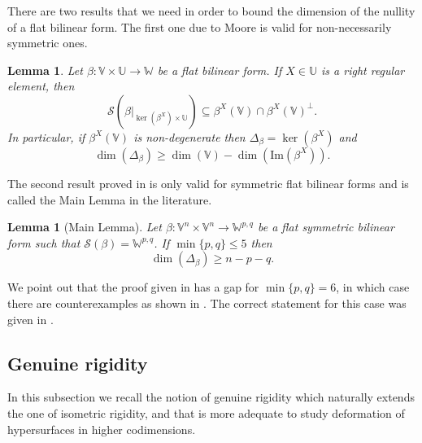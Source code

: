 \documentclass{article}
\newtheorem{lema}[thm]{Lemma}
\theoremstyle{remark}
\begin{document}
There are two results that we need in order to bound the dimension of the nullity of a flat bilinear form. The first one due to Moore \cite{Moo} is valid for non-necessarily symmetric ones.
\begin{lema}\label{nulidad para no simetrica}
    Let $\beta:\mathbb{V}\times \mathbb{U}\rightarrow \mathbb{W}$ be a flat bilinear form. If $X\in \mathbb{U}$ is a right regular element, then
    \begin{equation*}
        \mathcal{S}(\beta|_{\ker(\beta^X)\times \mathbb{U}})\subseteq \beta^X(\mathbb{V})\cap\beta^X(\mathbb{V})^\perp.
    \end{equation*}
    In particular, if $\beta^X(\mathbb{V})$ is non-degenerate then $\Delta_\beta=\ker(\beta^X)$ and
    \begin{equation*}
        \dim(\Delta_\beta)\geq \dim(\mathbb{V})-\dim(\text{Im}(\beta^X)).
    \end{equation*}
\end{lema}

The second result proved in \cite{DF4} is only valid for symmetric flat bilinear forms and is called the Main Lemma in the literature.
\begin{lema}[Main Lemma]\label{Main lemma}
    Let $\beta:\mathbb{V}^n\times \mathbb{V}^n\rightarrow \mathbb{W}^{p,q}$ be a flat symmetric bilinear form such that $\mathcal{S}(\beta)=\mathbb{W}^{p,q}$. If $\min\{p,q\}\leq 5$ then
    \begin{equation*}
        \dim(\Delta_\beta)\geq n-p-q.
    \end{equation*}
\end{lema}
We point out that the proof given in \cite{DF4} has a gap for $\min\{p,q\}=6$, in which case there are counterexamples as shown in \cite{DF5}. The correct statement for this case was given in \cite{DF3}.
\subsection{Genuine rigidity}\label{pares de inmersiones}

In this subsection we recall the notion of genuine rigidity which naturally extends the one of isometric rigidity, and that is more adequate to study deformation of hypersurfaces in higher codimensions.

\text{ }
\end{document}
